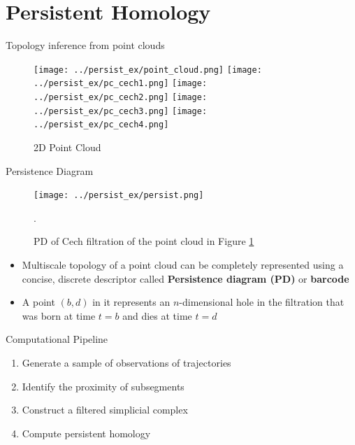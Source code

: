 \documentclass{beamer}
\begin{document}
\section{Persistent Homology}
\begin{frame}{Topology inference from point clouds}
    \begin{figure}[H]
        \begin{overprint}
            \centering\texttt{[image: ../persist\_ex/point\_cloud.png]}
            \centering\texttt{[image: ../persist\_ex/pc\_cech1.png]}
            \centering\texttt{[image: ../persist\_ex/pc\_cech2.png]}
            \centering\texttt{[image: ../persist\_ex/pc\_cech3.png]}
            \centering\texttt{[image: ../persist\_ex/pc\_cech4.png]}
        \end{overprint}
        \caption{2D Point Cloud}
        \label{fig1}
    \end{figure}
\end{frame}
\begin{frame}{Persistence Diagram}
        \begin{minipage}[b]{0.4\linewidth}
            \begin{figure}
            \texttt{[image: ../persist\_ex/persist.png]}
            \caption{PD of Cech filtration of the point cloud in Figure \ref{fig1}}.
            \end{figure}
        \end{minipage}
        \hspace{0.5cm}
        \begin{minipage}[b]{0.4\linewidth}
            \begin{itemize}
            \item Multiscale topology of a point cloud can be completely represented using a concise, discrete descriptor called \textbf{Persistence diagram (PD)} or \textbf{barcode}
            \pause
            \item A point $(b, d)$ in it represents an $n$-dimensional hole 
            in the filtration that was born at time $t = b$ and dies at time $t = d$
            \pause
            \end{itemize}
        \end{minipage}
\end{frame}

\begin{frame}{Computational Pipeline}
    \begin{enumerate}
        \item Generate a sample of observations of trajectories
        \pause
        \item Identify the proximity of subsegments
        \pause
        \item Construct a filtered simplicial complex
        \pause
        \item Compute persistent homology
    \end{enumerate}
\end{frame}
\end{document}
